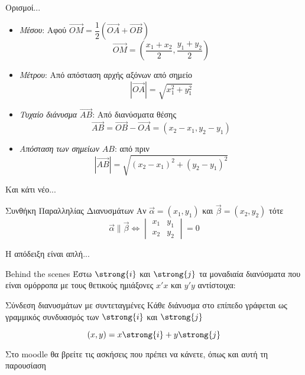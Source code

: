 \documentclass[greek]{beamer}
\begin{document}
\begin{frame}{Ορισμοί...}
      \begin{itemize}
            \item<1-> \emph{Μέσου}: Αφού $\overrightarrow{ΟΜ}=\dfrac{1}{2}\left( \overrightarrow{ΟΑ}+\overrightarrow{ΟΒ}\right)$
                  $$\overrightarrow{ΟΜ}=\left(\dfrac{x_1+x_2}{2},\dfrac{y_1+y_2}{2}\right)$$
            \item<2-> \emph{Μέτρου}: Από απόσταση αρχής αξόνων από σημείο
                  $$|\overrightarrow{ΟΑ}|=\sqrt{x_1^2+y_1^2}$$
            \item<3-> \emph{Τυχαίο διάνυσμα $\overrightarrow{ΑΒ}$}: Από διανύσματα θέσης
                  $$\overrightarrow{ΑΒ}=\overrightarrow{ΟΒ}-\overrightarrow{ΟΑ}=(x_2-x_1,y_2-y_1)$$
            \item<4-> \emph{Aπόσταση των σημείων $ΑΒ$}: από πριν
                  $$|\overrightarrow{ΑΒ}|=\sqrt{(x_2-x_1)^2+(y_2-y_1)^2}$$
      \end{itemize}
\end{frame}

\begin{frame}{Και κάτι νέο...}
      \begin{block}{Συνθήκη Παραλληλίας Διανυσμάτων}
            Αν $\vec{α}=(x_1,y_1)$ και $\vec{β}=(x_2,y_2)$ τότε
            $$\vec{α} 	\parallel \vec{β} \iff \begin{vmatrix}
                        x_1 & y_1 \\
                        x_2 & y_2
                  \end{vmatrix}=0$$
      \end{block} \pause
      Η απόδειξη είναι απλή...
\end{frame}

\begin{frame}{Behind the scenes}
      Έστω $\strong{i}$ και $\strong{j}$ τα μοναδιαία διανύσματα που είναι ομόρροπα με τους θετικούς ημιάξονες $x'x$ και $y'y$ αντίστοιχα:
      \begin{block}{Σύνδεση διανυσμάτων με συντεταγμένες}
            Κάθε διάνυσμα στο επίπεδο γράφεται ως γραμμικός συνδυασμός των $\strong{i}$ και $\strong{j}$

            $$(x,y)=x\strong{i}+y\strong{j}$$
      \end{block}
\end{frame}

\begin{frame}
      Στο moodle θα βρείτε τις ασκήσεις που πρέπει να κάνετε, όπως και αυτή τη παρουσίαση
\end{frame}
\end{document}
